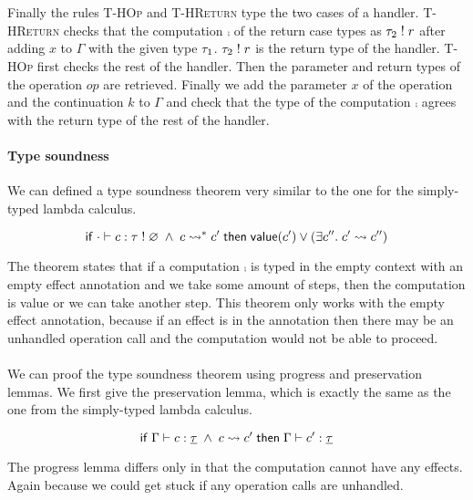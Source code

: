 {\\\\
Finally the rules \textsc{T-HOp} and \textsc{T-HReturn} type the two cases of a handler.
\textsc{T-HReturn} checks that the computation $\comp$ of the return case types as $\tau_2 \; ! \; r$ after adding $x$ to $\Gamma$ with the given type $\tau_1$. $\tau_2 \; ! \; r$ is the return type of the handler.
\textsc{T-HOp} first checks the rest of the handler. Then the parameter and return types of the operation $op$ are retrieved.
Finally we add the parameter $x$ of the operation and the continuation $k$ to $\Gamma$ and check that the type of the computation $\comp$ agrees with the return type of the rest of the handler.

\paragraph{Type soundness}
We can defined a type soundness theorem very similar to the one for the simply-typed lambda calculus.

\begin{theorem}
\[
	\mathsf{if}\;
		\cdot \vdash c : \tau \; ! \; \varnothing
		\;\land\;
		c \rightsquigarrow^* c'
	\;\mathsf{then}\;
		\mathsf{value}(c')
		\lor
		(\exists c''.\; c' \rightsquigarrow c'')
\]
\end{theorem}

The theorem states that if a computation $\comp$ is typed in the empty context with an empty effect annotation and we take some amount of steps, then the computation is value or we can take another step.
This theorem only works with the empty effect annotation, because if an effect is in the annotation then there may be an unhandled operation call and the computation would not be able to proceed.
\\\\
We can proof the type soundness theorem using progress and preservation lemmas.
We first give the preservation lemma, which is exactly the same as the one from the simply-typed lambda calculus.

\begin{lemma}[Preservation]
\[
	\mathsf{if}\;
		\Gamma \vdash c : \underline{\tau}
		\;\land\;
		c \rightsquigarrow c'
	\;\mathsf{then}\;
		\Gamma \vdash c' : \underline{\tau}
\]
\end{lemma}

The progress lemma differs only in that the computation cannot have any effects.
Again because we could get stuck if any operation calls are unhandled.

}
